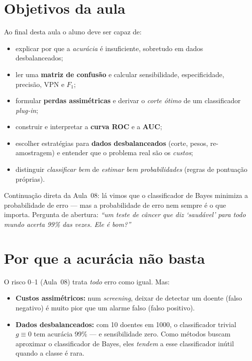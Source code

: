 \documentclass[11pt,a4paper]{article}
\begin{document}

\section*{Objetivos da aula}
Ao final desta aula o aluno deve ser capaz de:
\begin{itemize}[leftmargin=1.4cm]
  \item explicar por que a \emph{acurácia} é insuficiente, sobretudo em dados
        desbalanceados;
  \item ler uma \textbf{matriz de confusão} e calcular sensibilidade,
        especificidade, precisão, VPN e $F_1$;
  \item formular \textbf{perdas assimétricas} e derivar o \emph{corte ótimo} de um
        classificador \emph{plug-in};
  \item construir e interpretar a \textbf{curva ROC} e a \textbf{AUC};
  \item escolher estratégias para \textbf{dados desbalanceados} (corte, pesos,
        re-amostragem) e entender que o problema real são os \emph{custos};
  \item distinguir \emph{classificar bem} de \emph{estimar bem
        probabilidades} (regras de pontuação próprias).
\end{itemize}

\begin{emsala}
Continuação direta da Aula~08: lá vimos que o classificador de Bayes minimiza a
probabilidade de erro --- mas a probabilidade de erro nem sempre é o que importa.
Pergunta de abertura: \emph{``um teste de câncer que diz `saudável' para todo mundo
acerta 99\% das vezes. Ele é bom?''}
\end{emsala}

\section{Por que a acurácia não basta}
O risco 0--1 (Aula~08) trata \emph{todo} erro como igual. Mas:
\begin{itemize}[leftmargin=1.4cm,nosep]
  \item \textbf{Custos assimétricos:} num \emph{screening}, deixar de detectar um
        doente (falso negativo) é muito pior que um alarme falso (falso positivo).
  \item \textbf{Dados desbalanceados:} com 10 doentes em 1000, o classificador
        trivial $g\equiv 0$ tem acurácia 99\% --- e sensibilidade zero. Como
        métodos buscam aproximar o classificador de Bayes, eles \emph{tendem} a
        esse classificador inútil quando a classe é rara.
\end{itemize}
\end{document}
